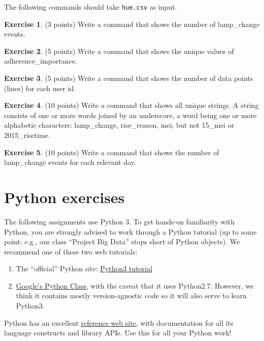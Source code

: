 \documentclass[a4paper]{report}
\theoremstyle{definition}
\newtheorem{exercise}{Exercise}
\begin{document}
\noindent The following commands should take \texttt{hue.csv} as input.

\begin{exercise}
	(3 points) Write a command that shows the number of lamp\_change events.
\end{exercise}

\begin{exercise}
	(5 points) Write a command that shows the unique values of adherence\_importance.
\end{exercise}

\begin{exercise}
	(5 points) Write a command that shows the number of data points (lines) for each
	user id.
\end{exercise}

\begin{exercise}
	(10 points) Write a command that shows all unique strings. A string consists of one or more words joined by an underscore, a word being
	one or more alphabetic characters: lamp\_change, rise\_reason, mei, but not 15\_mei or 2015\_risetime.
\end{exercise}

\begin{exercise}
	(10 points) Write a command that shows the number of lamp\_change events for each relevant day.
\end{exercise}


\section*{Python exercises}
\label{python-exercises}
The following assignments use Python 3. To get hands-on familiarity with
Python, you are strongly advised to work through a Python tutorial (up to
some point: e.g., our class ``Project Big Data'' stops short of Python objects). We recommend one of these two web tutorials:
\begin{enumerate}
	\setlength\itemsep{1mm}
	\item The ``official'' Python site: \href{https://docs.python.org/3/tutorial}{Python3 tutorial}
	\item \href{https://developers.google.com/edu/python/}{Google's Python Class}, with the caveat that it uses Python2.7. However, we think it contains	mostly version-agnostic code so it will also serve to learn Python3.
\end{enumerate}

\noindent Python has an excellent \href{https://docs.python.org/3/}{reference web site}, with documentation for all its language
constructs and library APIs. Use this for all your Python work!
\end{document}
